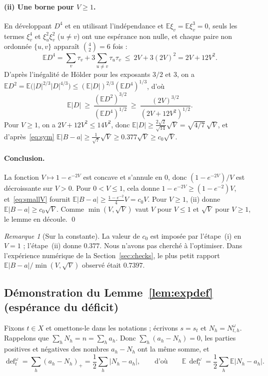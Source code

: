 \documentclass[11pt,a4paper]{article}
\theoremstyle{definition}
\theoremstyle{remark}
\newtheorem{remark}[theorem]{Remarque}
\newcommand{\E}{\mathbb{E}}
\newcommand{\dfc}{\operatorname{def}}
\begin{document}
\paragraph{(ii) Une borne pour $V\ge1$.} En développant $D^4$ et en utilisant
l'indépendance et $\E\xi_v=\E\xi_v^3=0$, seuls les termes $\xi_v^4$ et $\xi_u^2\xi_v^2$
($u\ne v$) ont une espérance non nulle, et chaque paire non ordonnée $\{u,v\}$ apparaît
$\binom42=6$ fois :
\[
\E D^4=\sum_v\tau_v+3\sum_{u\ne v}\tau_u\tau_v\ \le\ 2V+3(2V)^2=2V+12V^2 .
\]
D'après l'inégalité de H\"older pour les exposants $3/2$ et $3$, on a
$\E D^2=\E\bigl(|D|^{2/3}|D|^{4/3}\bigr)\le(\E|D|)^{2/3}(\E D^4)^{1/3}$, d'où
\[
\E|D|\ \ge\ \frac{(\E D^2)^{3/2}}{(\E D^4)^{1/2}}\ \ge\ \frac{(2V)^{3/2}}{(2V+12V^2)^{1/2}} .
\]
Pour $V\ge1$, on a $2V+12V^2\le14V^2$, donc $\E|D|\ge\frac{2\sqrt2}{\sqrt{14}}\sqrt V
=\sqrt{4/7}\,\sqrt V$, et d'après~\eqref{eq:sym}
$\E|B-a|\ge\frac{1}{\sqrt7}\sqrt V\ge0.377\sqrt V\ge c_0\sqrt V$.

\paragraph{Conclusion.} La fonction $V\mapsto1-e^{-2V}$ est concave et s'annule en $0$, donc
$(1-e^{-2V})/V$ est décroissante sur $V>0$. Pour $0<V\le1$, cela donne
$1-e^{-2V}\ge(1-e^{-2})V$, et~\eqref{eq:smallV} fournit
$\E|B-a|\ge\frac{1-e^{-2}}{4}V=c_0V$. Pour $V\ge1$, (ii) donne $\E|B-a|\ge c_0\sqrt V$. Comme
$\min(V,\sqrt V)$ vaut $V$ pour $V\le1$ et $\sqrt V$ pour $V\ge1$, le lemme en découle. \qed

\begin{remark}[Sur la constante]\label{rem:const}
La valeur de $c_0$ est imposée par l'étape~(i) en $V=1$ ; l'étape~(ii) donne $0.377$. Nous
n'avons pas cherché à l'optimiser. Dans l'expérience numérique de la
Section~\ref{sec:checks}, le plus petit rapport $\E|B-a|/\min(V,\sqrt V)$ observé était
$0.7397$.
\end{remark}

\subsection{Démonstration du Lemme~\ref{lem:expdef} (espérance du déficit)}

Fixons $t\in X$ et omettons-le dans les notations ; écrivons $s=s_t$ et
$N_h=N^\omega_{t,h}$. Rappelons que $\sum_hN_h=n=\sum_ha_h$. Donc $\sum_h(a_h-N_h)=0$, les
parties positives et négatives des nombres $a_h-N_h$ ont la même somme, et
\[
\dfc^\omega_t=\sum_h(a_h-N_h)_+=\frac12\sum_h|N_h-a_h|,\qquad\text{d'où}\qquad
\E\,\dfc^\omega_t=\frac12\sum_h\E|N_h-a_h| .
\]
\end{document}
